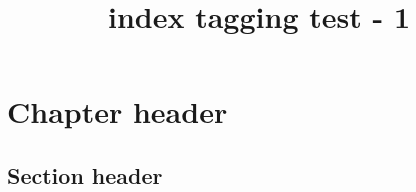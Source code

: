 \documentclass{book}
\title{index tagging test - 1}
\begin{document}
\chapter{Chapter header} %
\section{Section header} %

\printindex[aut]
\end{document}
